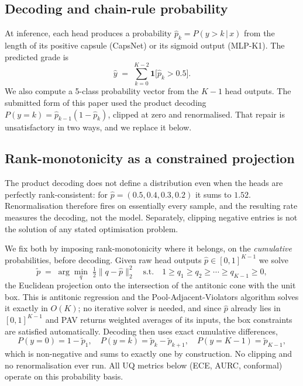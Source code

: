 \documentclass[journal]{IEEEtran}
\begin{document}
\subsection{Decoding and chain-rule probability}
At inference, each head produces a probability $\hat{p}_k = P(y{>}k\,|\,x)$ from the length of its positive capsule (CapsNet) or its sigmoid output (MLP-K1). The predicted grade is
\begin{equation}
    \hat{y} \;=\; \sum_{k=0}^{K-2} \mathbf{1}\bigl[\hat{p}_k > 0.5\bigr].
    \label{eq:predict}
\end{equation}
We also compute a 5-class probability vector from the $K{-}1$ head outputs. The submitted form of this paper used the product decoding $P(y{=}k) = \hat{p}_{k-1}(1{-}\hat{p}_k)$, clipped at zero and renormalised. That repair is unsatisfactory in two ways, and we replace it below.

\subsection{Rank-monotonicity as a constrained projection}
\label{sec:monotone}
The product decoding does not define a distribution even when the heads are perfectly rank-consistent: for $\hat{p} = (0.5, 0.4, 0.3, 0.2)$ it sums to $1.52$. Renormalisation therefore fires on essentially every sample, and the resulting rate measures the decoding, not the model. Separately, clipping negative entries is not the solution of any stated optimisation problem.

We fix both by imposing rank-monotonicity where it belongs, on the \emph{cumulative} probabilities, before decoding. Given raw head outputs $\hat{p} \in [0,1]^{K-1}$ we solve
\begin{equation}
    \tilde{p} \;=\; \arg\min_{q}\; \tfrac{1}{2}\lVert q - \hat{p} \rVert_2^2
    \quad \text{s.t.} \quad 1 \geq q_1 \geq q_2 \geq \cdots \geq q_{K-1} \geq 0,
    \label{eq:monotone}
\end{equation}
the Euclidean projection onto the intersection of the antitonic cone with the unit box. This is antitonic regression and the Pool-Adjacent-Violators algorithm solves it exactly in $O(K)$; no iterative solver is needed, and since $\hat{p}$ already lies in $[0,1]^{K-1}$ and PAV returns weighted averages of its inputs, the box constraints are satisfied automatically. Decoding then uses exact cumulative differences,
\begin{equation}
    P(y{=}0) = 1 - \tilde{p}_1, \quad
    P(y{=}k) = \tilde{p}_k - \tilde{p}_{k+1}, \quad
    P(y{=}K{-}1) = \tilde{p}_{K-1},
    \label{eq:decode}
\end{equation}
which is non-negative and sums to exactly one by construction. No clipping and no renormalisation ever run. All UQ metrics below (ECE, AURC, conformal) operate on this probability basis.
\end{document}
